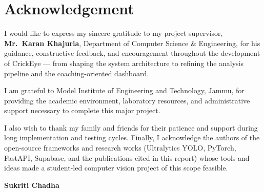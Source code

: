 \chapter*{Acknowledgement}

\hspace{10mm}I would like to express my sincere gratitude to my project supervisor, \textbf{Mr.~Karan Khajuria}, Department of Computer Science \& Engineering, for his guidance, constructive feedback, and encouragement throughout the development of CrickEye --- from shaping the system architecture to refining the analysis pipeline and the coaching-oriented dashboard.

\hspace{10mm}I am grateful to Model Institute of Engineering and Technology, Jammu, for providing the academic environment, laboratory resources, and administrative support necessary to complete this major project.

\hspace{10mm}I also wish to thank my family and friends for their patience and support during long implementation and testing cycles. Finally, I acknowledge the authors of the open-source frameworks and research works (Ultralytics YOLO, PyTorch, FastAPI, Supabase, and the publications cited in this report) whose tools and ideas made a student-led computer vision project of this scope feasible.

\hspace{10mm}\textbf{Sukriti Chadha}
